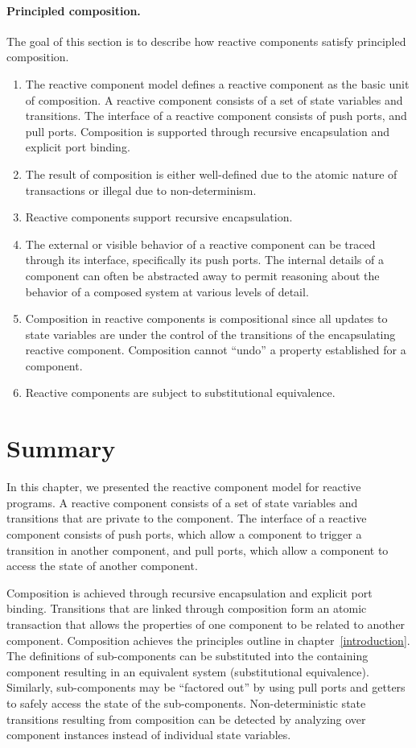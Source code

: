 \paragraph{Principled composition.}
The goal of this section is to describe how reactive components satisfy principled composition.
\begin{enumerate}
\item The reactive component model defines a reactive component as the basic unit of composition.
A reactive component consists of a set of state variables and transitions.
The interface of a reactive component consists of push ports, and pull ports.
Composition is supported through recursive encapsulation and explicit port binding.

\item The result of composition is either well-defined due to the atomic nature of transactions or illegal due to non-determinism.

\item Reactive components support recursive encapsulation.

\item The external or visible behavior of a reactive component can be traced through its interface, specifically its push ports.
The internal details of a component can often be abstracted away to permit reasoning about the behavior of a composed system at various levels of detail.

\item Composition in reactive components is compositional since all updates to state variables are under the control of the transitions of the encapsulating reactive component.
Composition cannot ``undo'' a property established for a component.

\item Reactive components are subject to substitutional equivalence.
\end{enumerate}

\section{Summary}
In this chapter, we presented the reactive component model for reactive programs.
A reactive component consists of a set of state variables and transitions that are private to the component.
The interface of a reactive component consists of push ports, which allow a component to trigger a transition in another component, and pull ports, which allow a component to access the state of another component.

Composition is achieved through recursive encapsulation and explicit port binding.
Transitions that are linked through composition form an atomic transaction that allows the properties of one component to be related to another component.
Composition achieves the principles outline in chapter~\ref{introduction}.
The definitions of sub-components can be substituted into the containing component resulting in an equivalent system (substitutional equivalence).
Similarly, sub-components may be ``factored out'' by using pull ports and getters to safely access the state of the sub-components.
Non-deterministic state transitions resulting from composition can be detected by analyzing over component instances instead of individual state variables.
